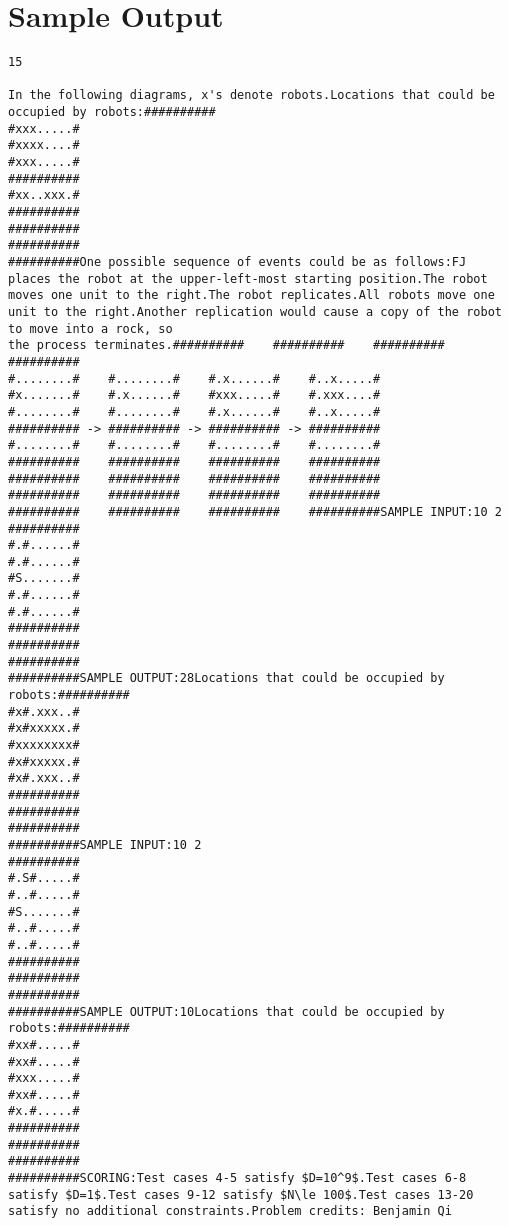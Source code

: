\documentclass[12pt]{article}
\begin{document}
\section*{Sample Output}
\begin{verbatim}
15

In the following diagrams, x's denote robots.Locations that could be occupied by robots:##########
#xxx.....#
#xxxx....#
#xxx.....#
##########
#xx..xxx.#
##########
##########
##########
##########One possible sequence of events could be as follows:FJ places the robot at the upper-left-most starting position.The robot moves one unit to the right.The robot replicates.All robots move one unit to the right.Another replication would cause a copy of the robot to move into a rock, so
the process terminates.##########    ##########    ##########    ##########
#........#    #........#    #.x......#    #..x.....#
#x.......#    #.x......#    #xxx.....#    #.xxx....#
#........#    #........#    #.x......#    #..x.....#
########## -> ########## -> ########## -> ##########
#........#    #........#    #........#    #........#
##########    ##########    ##########    ##########
##########    ##########    ##########    ##########
##########    ##########    ##########    ##########
##########    ##########    ##########    ##########SAMPLE INPUT:10 2
##########
#.#......#
#.#......#
#S.......#
#.#......#
#.#......#
##########
##########
##########
##########SAMPLE OUTPUT:28Locations that could be occupied by robots:##########
#x#.xxx..#
#x#xxxxx.#
#xxxxxxxx#
#x#xxxxx.#
#x#.xxx..#
##########
##########
##########
##########SAMPLE INPUT:10 2
##########
#.S#.....#
#..#.....#
#S.......#
#..#.....#
#..#.....#
##########
##########
##########
##########SAMPLE OUTPUT:10Locations that could be occupied by robots:##########
#xx#.....#
#xx#.....#
#xxx.....#
#xx#.....#
#x.#.....#
##########
##########
##########
##########SCORING:Test cases 4-5 satisfy $D=10^9$.Test cases 6-8 satisfy $D=1$.Test cases 9-12 satisfy $N\le 100$.Test cases 13-20 satisfy no additional constraints.Problem credits: Benjamin Qi


\end{verbatim}
\end{document}
